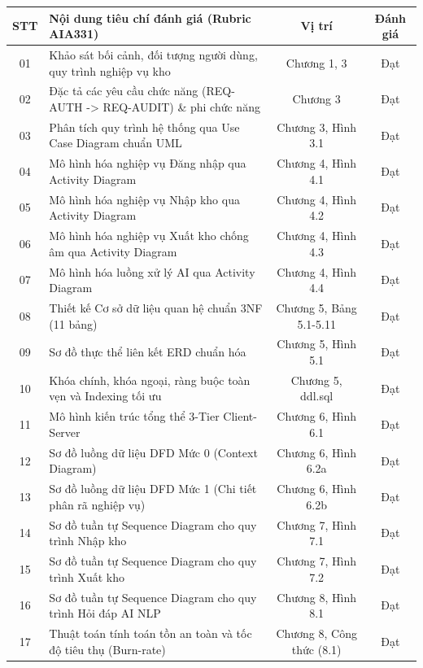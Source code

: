 \vspace{4mm}
\begin{longtable}{|c|p{8.5cm}|c|c|}
\hline
\rowcolor{tablehead}
\textbf{STT} & \textbf{Nội dung tiêu chí đánh giá (Rubric AIA331)} & \textbf{Vị trí} & \textbf{Đánh giá} \\ \hline
\endhead
01 & Khảo sát bối cảnh, đối tượng người dùng, quy trình nghiệp vụ kho & Chương 1, 3 & Đạt \\ \hline
02 & Đặc tả các yêu cầu chức năng (REQ-AUTH -> REQ-AUDIT) \& phi chức năng & Chương 3 & Đạt \\ \hline
03 & Phân tích quy trình hệ thống qua Use Case Diagram chuẩn UML & Chương 3, Hình 3.1 & Đạt \\ \hline
04 & Mô hình hóa nghiệp vụ Đăng nhập qua Activity Diagram & Chương 4, Hình 4.1 & Đạt \\ \hline
05 & Mô hình hóa nghiệp vụ Nhập kho qua Activity Diagram & Chương 4, Hình 4.2 & Đạt \\ \hline
06 & Mô hình hóa nghiệp vụ Xuất kho chống âm qua Activity Diagram & Chương 4, Hình 4.3 & Đạt \\ \hline
07 & Mô hình hóa luồng xử lý AI qua Activity Diagram & Chương 4, Hình 4.4 & Đạt \\ \hline
08 & Thiết kế Cơ sở dữ liệu quan hệ chuẩn 3NF (11 bảng) & Chương 5, Bảng 5.1-5.11 & Đạt \\ \hline
09 & Sơ đồ thực thể liên kết ERD chuẩn hóa & Chương 5, Hình 5.1 & Đạt \\ \hline
10 & Khóa chính, khóa ngoại, ràng buộc toàn vẹn và Indexing tối ưu & Chương 5, ddl.sql & Đạt \\ \hline
11 & Mô hình kiến trúc tổng thể 3-Tier Client-Server & Chương 6, Hình 6.1 & Đạt \\ \hline
12 & Sơ đồ luồng dữ liệu DFD Mức 0 (Context Diagram) & Chương 6, Hình 6.2a & Đạt \\ \hline
13 & Sơ đồ luồng dữ liệu DFD Mức 1 (Chi tiết phân rã nghiệp vụ) & Chương 6, Hình 6.2b & Đạt \\ \hline
14 & Sơ đồ tuần tự Sequence Diagram cho quy trình Nhập kho & Chương 7, Hình 7.1 & Đạt \\ \hline
15 & Sơ đồ tuần tự Sequence Diagram cho quy trình Xuất kho & Chương 7, Hình 7.2 & Đạt \\ \hline
16 & Sơ đồ tuần tự Sequence Diagram cho quy trình Hỏi đáp AI NLP & Chương 8, Hình 8.1 & Đạt \\ \hline
17 & Thuật toán tính toán tồn an toàn và tốc độ tiêu thụ (Burn-rate) & Chương 8, Công thức (8.1) & Đạt \\ \hline

\end{longtable}
